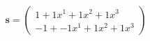 \documentclass[preview]{standalone}
\begin{document}
\begin{align*}
\mathbf{s} = \begin{pmatrix}1 + 1x^{1} + 1x^{2} + 1x^{3} \\ -1 + -1x^{1} + 1x^{2} + 1x^{3}\end{pmatrix}
\end{align*}
\end{document}

